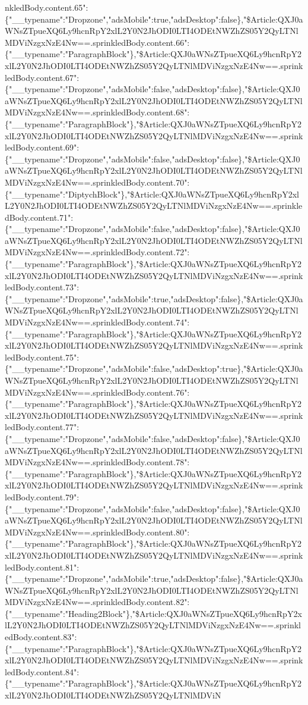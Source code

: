 nkledBody.content.65":\{"\_\_typename":"Dropzone","adsMobile":true,"adsDesktop":false\},"\$Article:QXJ0aWNsZTpueXQ6Ly9hcnRpY2xlL2Y0N2JhODI0LTI4ODEtNWZhZS05Y2QyLTNlMDViNzgxNzE4Nw==.sprinkledBody.content.66":\{"\_\_typename":"ParagraphBlock"\},"\$Article:QXJ0aWNsZTpueXQ6Ly9hcnRpY2xlL2Y0N2JhODI0LTI4ODEtNWZhZS05Y2QyLTNlMDViNzgxNzE4Nw==.sprinkledBody.content.67":\{"\_\_typename":"Dropzone","adsMobile":false,"adsDesktop":false\},"\$Article:QXJ0aWNsZTpueXQ6Ly9hcnRpY2xlL2Y0N2JhODI0LTI4ODEtNWZhZS05Y2QyLTNlMDViNzgxNzE4Nw==.sprinkledBody.content.68":\{"\_\_typename":"ParagraphBlock"\},"\$Article:QXJ0aWNsZTpueXQ6Ly9hcnRpY2xlL2Y0N2JhODI0LTI4ODEtNWZhZS05Y2QyLTNlMDViNzgxNzE4Nw==.sprinkledBody.content.69":\{"\_\_typename":"Dropzone","adsMobile":false,"adsDesktop":false\},"\$Article:QXJ0aWNsZTpueXQ6Ly9hcnRpY2xlL2Y0N2JhODI0LTI4ODEtNWZhZS05Y2QyLTNlMDViNzgxNzE4Nw==.sprinkledBody.content.70":\{"\_\_typename":"DiptychBlock"\},"\$Article:QXJ0aWNsZTpueXQ6Ly9hcnRpY2xlL2Y0N2JhODI0LTI4ODEtNWZhZS05Y2QyLTNlMDViNzgxNzE4Nw==.sprinkledBody.content.71":\{"\_\_typename":"Dropzone","adsMobile":false,"adsDesktop":false\},"\$Article:QXJ0aWNsZTpueXQ6Ly9hcnRpY2xlL2Y0N2JhODI0LTI4ODEtNWZhZS05Y2QyLTNlMDViNzgxNzE4Nw==.sprinkledBody.content.72":\{"\_\_typename":"ParagraphBlock"\},"\$Article:QXJ0aWNsZTpueXQ6Ly9hcnRpY2xlL2Y0N2JhODI0LTI4ODEtNWZhZS05Y2QyLTNlMDViNzgxNzE4Nw==.sprinkledBody.content.73":\{"\_\_typename":"Dropzone","adsMobile":true,"adsDesktop":false\},"\$Article:QXJ0aWNsZTpueXQ6Ly9hcnRpY2xlL2Y0N2JhODI0LTI4ODEtNWZhZS05Y2QyLTNlMDViNzgxNzE4Nw==.sprinkledBody.content.74":\{"\_\_typename":"ParagraphBlock"\},"\$Article:QXJ0aWNsZTpueXQ6Ly9hcnRpY2xlL2Y0N2JhODI0LTI4ODEtNWZhZS05Y2QyLTNlMDViNzgxNzE4Nw==.sprinkledBody.content.75":\{"\_\_typename":"Dropzone","adsMobile":false,"adsDesktop":true\},"\$Article:QXJ0aWNsZTpueXQ6Ly9hcnRpY2xlL2Y0N2JhODI0LTI4ODEtNWZhZS05Y2QyLTNlMDViNzgxNzE4Nw==.sprinkledBody.content.76":\{"\_\_typename":"ParagraphBlock"\},"\$Article:QXJ0aWNsZTpueXQ6Ly9hcnRpY2xlL2Y0N2JhODI0LTI4ODEtNWZhZS05Y2QyLTNlMDViNzgxNzE4Nw==.sprinkledBody.content.77":\{"\_\_typename":"Dropzone","adsMobile":false,"adsDesktop":false\},"\$Article:QXJ0aWNsZTpueXQ6Ly9hcnRpY2xlL2Y0N2JhODI0LTI4ODEtNWZhZS05Y2QyLTNlMDViNzgxNzE4Nw==.sprinkledBody.content.78":\{"\_\_typename":"ParagraphBlock"\},"\$Article:QXJ0aWNsZTpueXQ6Ly9hcnRpY2xlL2Y0N2JhODI0LTI4ODEtNWZhZS05Y2QyLTNlMDViNzgxNzE4Nw==.sprinkledBody.content.79":\{"\_\_typename":"Dropzone","adsMobile":false,"adsDesktop":false\},"\$Article:QXJ0aWNsZTpueXQ6Ly9hcnRpY2xlL2Y0N2JhODI0LTI4ODEtNWZhZS05Y2QyLTNlMDViNzgxNzE4Nw==.sprinkledBody.content.80":\{"\_\_typename":"ParagraphBlock"\},"\$Article:QXJ0aWNsZTpueXQ6Ly9hcnRpY2xlL2Y0N2JhODI0LTI4ODEtNWZhZS05Y2QyLTNlMDViNzgxNzE4Nw==.sprinkledBody.content.81":\{"\_\_typename":"Dropzone","adsMobile":true,"adsDesktop":false\},"\$Article:QXJ0aWNsZTpueXQ6Ly9hcnRpY2xlL2Y0N2JhODI0LTI4ODEtNWZhZS05Y2QyLTNlMDViNzgxNzE4Nw==.sprinkledBody.content.82":\{"\_\_typename":"Heading2Block"\},"\$Article:QXJ0aWNsZTpueXQ6Ly9hcnRpY2xlL2Y0N2JhODI0LTI4ODEtNWZhZS05Y2QyLTNlMDViNzgxNzE4Nw==.sprinkledBody.content.83":\{"\_\_typename":"ParagraphBlock"\},"\$Article:QXJ0aWNsZTpueXQ6Ly9hcnRpY2xlL2Y0N2JhODI0LTI4ODEtNWZhZS05Y2QyLTNlMDViNzgxNzE4Nw==.sprinkledBody.content.84":\{"\_\_typename":"ParagraphBlock"\},"\$Article:QXJ0aWNsZTpueXQ6Ly9hcnRpY2xlL2Y0N2JhODI0LTI4ODEtNWZhZS05Y2QyLTNlMDViN